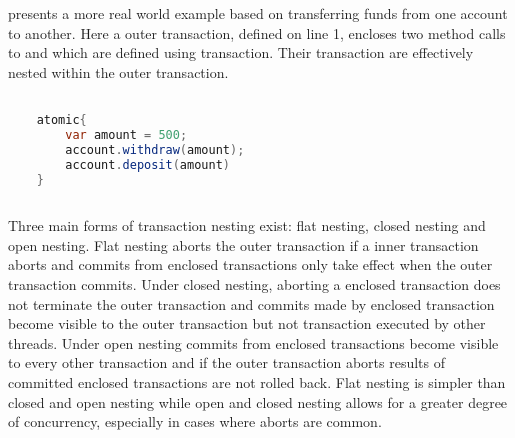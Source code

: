  presents a more real world example based on transferring funds from one account to another. Here a outer transaction, defined on line 1, encloses two method calls to  and  which are defined using transaction. Their transaction are effectively nested within the outer transaction.
\begin{lstlisting}[label=lst:stm_nested_transactions_real,
  caption={Real world nested transactions},
  language=Java,  
  showspaces=false,
  showtabs=false,
  breaklines=true,
  showstringspaces=false,
  breakatwhitespace=true,
  commentstyle=\color{greencomments},
  keywordstyle=\color{bluekeywords},
  stringstyle=\color{redstrings},
  morekeywords={atomic, retry, orElse, var}]  % Start your code-block

	atomic{
		var amount = 500;
		account.withdraw(amount);
		account.deposit(amount)
	}
       
\end{lstlisting}

Three main forms of transaction nesting exist: flat nesting, closed nesting and open nesting\cite[p. 1]{kumar2011hparstm}\cite[p. 42]{harris2010transactional}. Flat nesting aborts the outer transaction if a inner transaction aborts and commits from enclosed transactions only take effect when the outer transaction commits. Under closed nesting, aborting a enclosed transaction does not terminate the outer transaction and commits made by enclosed transaction become visible to the outer transaction but not transaction executed by other threads. Under open nesting commits from enclosed transactions become visible to every other transaction and if the outer transaction aborts results of committed enclosed transactions are not rolled back. Flat nesting is simpler than closed and open nesting while open and closed nesting allows for a greater degree of concurrency, especially in cases where aborts are common\cite[p. 43]{harris2010transactional}.

